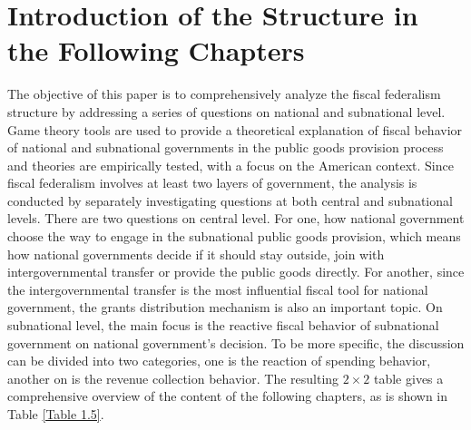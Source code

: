 \section{Introduction of the Structure in the Following Chapters}
The objective of this paper is to comprehensively analyze the fiscal federalism structure by addressing a series of questions on national and subnational level. Game theory tools are used to provide a theoretical explanation of fiscal behavior of national and subnational governments in the public goods provision process and theories are empirically tested, with a focus on the American context. Since fiscal federalism involves at least two layers of government, the analysis is conducted by separately investigating questions at both central and subnational levels. There are two questions on central level. For one, how national government choose the way to engage in the subnational public goods provision, which means how national governments decide if it should stay outside, join with intergovernmental transfer or provide the public goods directly. For another, since the intergovernmental transfer is the most influential fiscal tool for national government, the grants distribution mechanism is also an important topic. On subnational level, the main focus is the reactive fiscal behavior of subnational government on national government's decision. To be more specific, the discussion can be divided into two categories, one is the reaction of spending behavior, another on is the revenue collection behavior. The resulting $2\times2$ table gives a comprehensive overview of the content of the following chapters, as is shown in Table \ref*{Table 1.5}.

